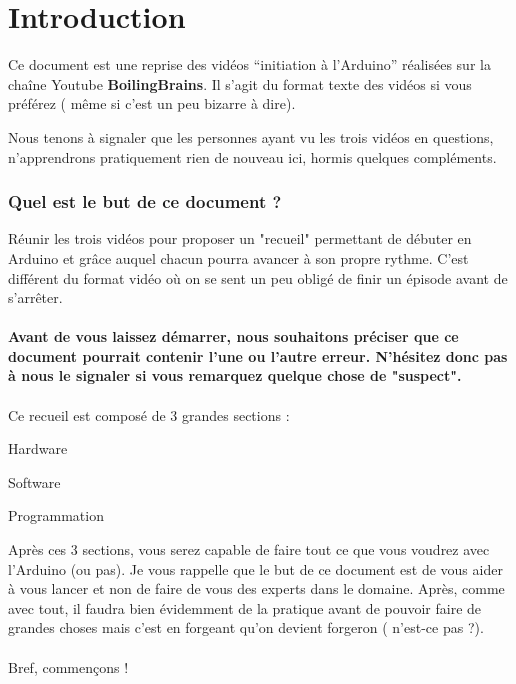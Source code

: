 \documentclass[12pt,a4paper]{article}
\begin{document}
\renewcommand*\contentsname{Sommaire}




\thispagestyle{fancy} %

\newpage
\tableofcontents
\newpage 

\section*{\LARGE Introduction}

\bigskip
Ce document est une reprise des vidéos “initiation à l’Arduino” réalisées sur la chaîne Youtube \textbf{BoilingBrains}. Il s’agit du format texte des vidéos si vous préférez ( même si c’est un peu bizarre à dire).

\bigskip

Nous tenons à signaler que les personnes ayant vu les trois vidéos en questions, n’apprendrons pratiquement rien de nouveau ici, hormis quelques compléments.

\subsubsection*{Quel est le but de ce document ?}

Réunir les trois vidéos pour proposer un "recueil" permettant de débuter en Arduino et grâce auquel chacun pourra avancer à son propre rythme. C'est différent du format vidéo où on se sent un peu obligé de finir un épisode avant de s'arrêter.
\\
\\
\textbf{Avant de vous laissez démarrer, nous souhaitons préciser que ce document pourrait contenir l'une ou l'autre erreur. N'hésitez donc pas à nous le signaler si vous remarquez quelque chose de "suspect".}
\\
\\
Ce recueil est composé de 3 grandes sections : 
\begin{compactitem}
\bigskip
\item Hardware
\item Software
\item Programmation
\end{compactitem}
\bigskip
Après ces 3 sections, vous serez capable de faire tout ce que vous voudrez avec l’Arduino (ou pas). Je vous rappelle que le but de ce document est de vous aider à vous lancer et non de faire de vous des experts dans le domaine. Après, comme avec tout, il faudra bien évidemment de la pratique avant de pouvoir faire de grandes choses mais c’est en forgeant qu’on devient forgeron ( n’est-ce pas ?).
\\
\\
Bref, commençons !
\end{document}
